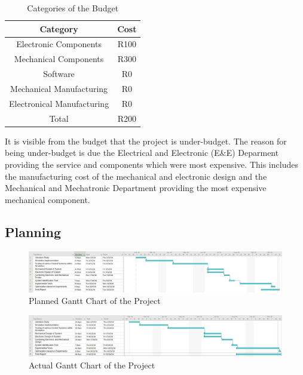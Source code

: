 \begin{table}[h]
	\centering
	\begin{tabular}{|c|c|}
		\hline
		Category & Cost \\
		\hline
		\hline
		Electronic Components & R100 \\
		\hline
		Mechanical Components & R300 \\
		\hline 
		Software & R0 \\
		\hline
		Mechanical Manufacturing & R0 \\
		\hline
		Electronical Manufacturing & R0 \\
		\hline
		\hline 
		Total & R200 \\
		\hline
		
	\end{tabular}
	\caption{Categories of the Budget }
	\label{table:budget}
	
\end{table}

It is visible from the budget that the project is under-budget. The reason for being under-budget is due the Electrical and Electronic (E\&E) Deparment providing the service and components which were most expensive. This includes the manufacturing cost of the mechanical and electronic design and the Mechanical and Mechatronic Department providing the most expensive mechanical component.


\subsection{Planning}

\begin{figure}[h]
	\centering
	\includegraphics[scale=0.35]{./figs/planning_gantt/planned_ganttchart.jpg}
	\caption{Planned Gantt Chart of the Project}
	\label{fig:planned_ganttchart}
\end{figure}

\begin{figure}[h]
	\centering
	\includegraphics[scale=0.35]{./figs/planning_gantt/actual_ganttchart.jpg}
	\caption{Actual Gantt Chart of the Project}
	\label{fig:actual_ganttchart}
\end{figure}

